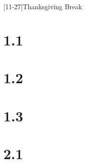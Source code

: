 \documentclass{schedule}
\begin{document}
\maketitle
\begin{schedule}
	[11-27]{Thanksgiving Break}

	\syllabus
	\section{1.1}
	\section{1.2}
	\section[2]{1.3}
	\examreview
	\exam
	\section{2.1}
	\finalreview
	\finalsweek[12-14][5]
	\winterbreak
\end{schedule}
\end{document}

